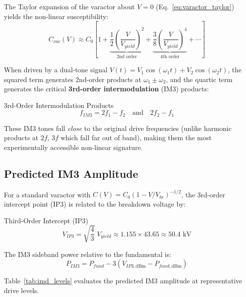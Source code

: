 The Taylor expansion of the varactor about $V = 0$ (Eq.~\ref{eq:varactor_taylor}) yields the non-linear susceptibility:
\begin{equation}
    C_{vac}(V) \approx C_0 \left[1 + \underbrace{\frac{1}{2}\left(\frac{V}{V_{yield}}\right)^{\!2}}_{\text{2nd order}} + \underbrace{\frac{3}{8}\left(\frac{V}{V_{yield}}\right)^{\!4}}_{\text{4th order}} + \cdots\right]
\end{equation}

When driven by a dual-tone signal $V(t) = V_1 \cos(\omega_1 t) + V_2 \cos(\omega_2 t)$, the squared term generates 2nd-order products at $\omega_1 \pm \omega_2$, and the quartic term generates the critical \textbf{3rd-order intermodulation} (IM3) products:
\begin{resultbox}{3rd-Order Intermodulation Products}
\begin{equation}
    f_{IM3} = 2f_1 - f_2 \quad \text{and} \quad 2f_2 - f_1
    \label{eq:im3_frequencies}
\end{equation}
\end{resultbox}

These IM3 tones fall \textit{close} to the original drive frequencies (unlike harmonic products at $2f$, $3f$ which fall far out of band), making them the most experimentally accessible non-linear signature.

\subsection{Predicted IM3 Amplitude}

For a standard varactor with $C(V) = C_0 (1 - V/V_{br})^{-1/2}$, the 3rd-order intercept point (IP3) is related to the breakdown voltage by:
\begin{resultbox}{Third-Order Intercept (IP3)}
\begin{equation}
    V_{IP3} = \sqrt{\frac{4}{3}}\; V_{yield} \approx 1.155 \times 43.65 \approx 50.4 \text{ kV}
    \label{eq:ip3}
\end{equation}
\end{resultbox}

The IM3 sideband power relative to the fundamental is:
\begin{equation}
    P_{IM3} = P_{fund} - 3(V_{IP3,\text{dBm}} - P_{fund,\text{dBm}})
    \label{eq:im3_power}
\end{equation}

Table~\ref{tab:imd_levels} evaluates the predicted IM3 amplitude at representative drive levels.

